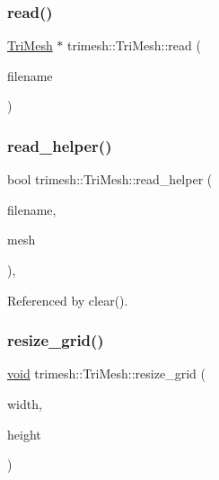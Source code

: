 \subsubsection{\texorpdfstring{read()}{read()}\hspace{0.1cm}{\footnotesize\ttfamily [2/2]}}
{\footnotesize\ttfamily \hyperlink{classtrimesh_1_1TriMesh}{Tri\+Mesh} $\ast$ trimesh\+::\+Tri\+Mesh\+::read (\begin{DoxyParamCaption}\item[{const \+::std\+::string \&}]{filename }\end{DoxyParamCaption})\hspace{0.3cm}{\ttfamily [static]}}

\mbox{\label{classtrimesh_1_1TriMesh_a7157944d3f98868565e8ad9312c89ac4}} 
\subsubsection{\texorpdfstring{read\+\_\+helper()}{read\_helper()}}
{\footnotesize\ttfamily bool trimesh\+::\+Tri\+Mesh\+::read\+\_\+helper (\begin{DoxyParamCaption}\item[{const char $\ast$}]{filename,  }\item[{\hyperlink{classtrimesh_1_1TriMesh}{Tri\+Mesh} $\ast$}]{mesh }\end{DoxyParamCaption})\hspace{0.3cm}{\ttfamily [static]}, {\ttfamily [protected]}}



Referenced by clear().

\mbox{\label{classtrimesh_1_1TriMesh_acae72d18d50be876554d1d7780766e1d}} 
\subsubsection{\texorpdfstring{resize\+\_\+grid()}{resize\_grid()}}
{\footnotesize\ttfamily \hyperlink{namespacetrimesh_a784ddfd979e1c579bda795a8edfc3f43}{void} trimesh\+::\+Tri\+Mesh\+::resize\+\_\+grid (\begin{DoxyParamCaption}\item[{int}]{width,  }\item[{int}]{height }\end{DoxyParamCaption})\hspace{0.3cm}{\ttfamily [inline]}}

